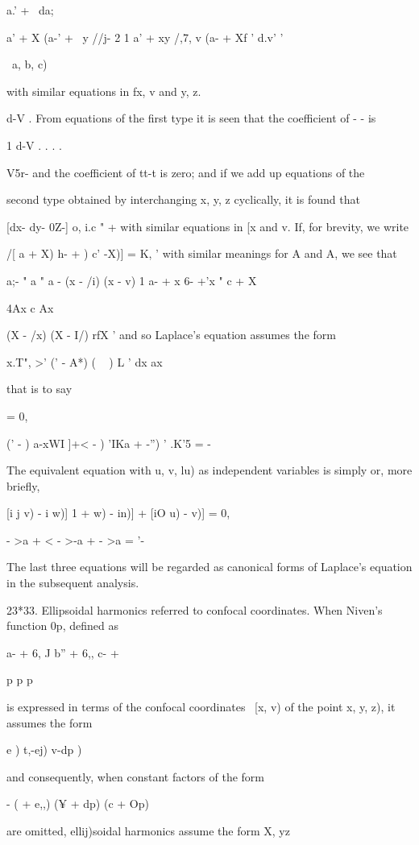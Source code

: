 {{{a.' + \ da;

a' + X (a-' + \ y //j- 2 1 a' + xy /,7, v (a- + Xf ' d.v' '

\ a, b, c)

with similar equations in fx, v and y, z.

d-V . From equations of the first type it is seen that the coefficient
of - - is

1 d-V . . . .

V5r- and the coefficient of tt-t is zero; and if we add up equations
of the

second type obtained by interchanging x, y, z cyclically, it is found
that

[dx- dy- 0Z-] o, i.c " + with similar equations in [x and v. If, for
brevity, we write

 /[ a + X) h- + ) c' -X)] = K, ' with similar meanings for A and A,
we see that

a;- " a " a - (x - /i) (x - v) 1 a- + x 6- +'x " c + X

4Ax c Ax

(X - /x) (X - I/) rfX ' and so Laplace's equation assumes the form

x.T", >' (' - A*) ( ~ ) L ' dx ax

that is to say

= 0,

(' - ) a-xWI ]+< - ) 'IKa + -'') ' .K'5 = -

The equivalent equation with u, v, lu) as independent variables is
simply or, more briefly,

[i j v) - i w)] 1 + w) - in)] + [iO u) - v)] = 0,

 - >a + < - >-a + - >a = '-

The last three equations will be regarded as canonical forms of
Laplace's equation in the subsequent analysis.

23*33. Ellipsoidal harmonics referred to confocal coordinates. When
Niven's function 0p, defined as

a- + 6, J b'' + 6,, c- +

p p p

%
%

is expressed in terms of the confocal coordinates \ [x, v) of the
point x, y, z), it assumes the form

  e ) t,-ej) v-dp )

and consequently, when constant factors of the form

- ( + e,,) (¥ + dp) (c + Op)

are omitted, ellij)soidal harmonics assume the form X, yz \

}}}
